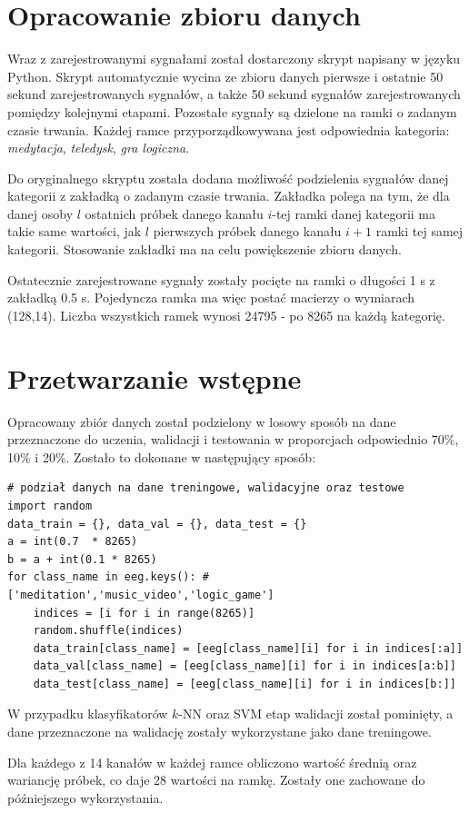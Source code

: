 \documentclass[notitlepage]{report}
\begin{document}
\section{Opracowanie zbioru danych}
Wraz z zarejestrowanymi sygnałami został dostarczony skrypt napisany w języku Python. Skrypt automatycznie wycina ze zbioru danych pierwsze i ostatnie 50 sekund zarejestrowanych sygnałów, a także 50 sekund sygnałów zarejestrowanych pomiędzy kolejnymi etapami. Pozostałe sygnały są dzielone na ramki o zadanym czasie trwania. Każdej ramce przyporządkowywana jest odpowiednia kategoria: \textit{medytacja}, \textit{teledysk}, \textit{gra logiczna}.

Do oryginalnego skryptu została dodana możliwość podzielenia sygnałów danej kategorii z zakładką o zadanym czasie trwania. Zakładka polega na tym, że dla danej osoby $l$ ostatnich próbek danego kanału $i$-tej ramki danej kategorii ma takie same wartości, jak $l$ pierwszych próbek danego kanału $i+1$ ramki tej samej kategorii. Stosowanie zakładki ma na celu powiększenie zbioru danych. 

Ostatecznie zarejestrowane sygnały zostały pocięte na ramki o długości 1 s z zakładką 0.5 s. Pojedyncza ramka ma więc postać macierzy o wymiarach (128,14). Liczba wszystkich ramek wynosi 24795 - po 8265 na każdą kategorię.

\section{Przetwarzanie wstępne}
Opracowany zbiór danych został podzielony w losowy sposób na dane przeznaczone do uczenia, walidacji i testowania w proporcjach odpowiednio 70\%, 10\% i 20\%. Zostało to dokonane w następujący sposób:
\begin{lstlisting}
# podział danych na dane treningowe, walidacyjne oraz testowe
import random
data_train = {}, data_val = {}, data_test = {}
a = int(0.7  * 8265)
b = a + int(0.1 * 8265)
for class_name in eeg.keys(): # ['meditation','music_video','logic_game']
	indices = [i for i in range(8265)]
	random.shuffle(indices)
	data_train[class_name] = [eeg[class_name][i] for i in indices[:a]]
	data_val[class_name] = [eeg[class_name][i] for i in indices[a:b]]
	data_test[class_name] = [eeg[class_name][i] for i in indices[b:]]
\end{lstlisting}
W przypadku klasyfikatorów $k$-NN oraz SVM etap walidacji został pominięty, a dane przeznaczone na walidację zostały wykorzystane jako dane treningowe. 

Dla każdego z 14 kanałów w każdej ramce obliczono wartość średnią oraz wariancję próbek, co daje 28 wartości na ramkę. Zostały one zachowane do późniejszego wykorzystania.
\end{document}
